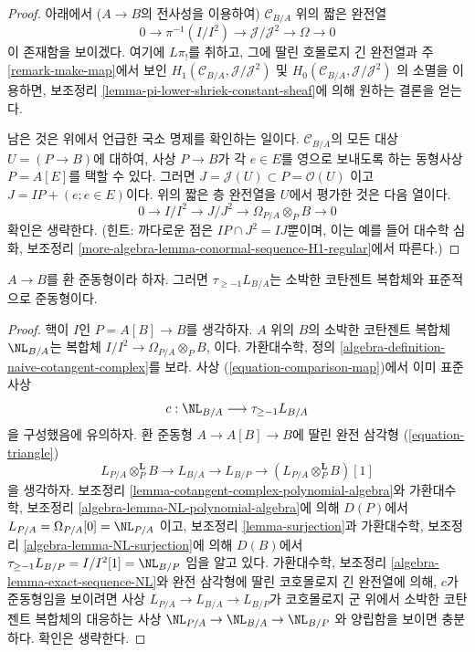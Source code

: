 \begin{proof}
아래에서 ($A \to B$의 전사성을 이용하여) $\mathcal{C}_{B/A}$ 위의 짧은
완전열
$$
0 \to \pi^{-1}(I/I^2) \to \mathcal{J}/\mathcal{J}^2 \to \Omega \to 0
$$
이 존재함을 보이겠다. 여기에 $L\pi_!$를 취하고, 그에 딸린 호몰로지
긴 완전열과 주 \ref{remark-make-map}에서 보인
$H_1(\mathcal{C}_{B/A}, \mathcal{J}/\mathcal{J}^2)$ 및
$H_0(\mathcal{C}_{B/A}, \mathcal{J}/\mathcal{J}^2)$
의 소멸을 이용하면, 보조정리
\ref{lemma-pi-lower-shriek-constant-sheaf}에 의해 원하는 결론을 얻는다.

\medskip\noindent
남은 것은 위에서 언급한 국소 명제를 확인하는 일이다.
$\mathcal{C}_{B/A}$의 모든 대상 $U = (P \to B)$에 대하여, 사상
$P \to B$가 각 $e \in E$를 영으로 보내도록 하는 동형사상
$P = A[E]$를 택할 수 있다. 그러면
$J = \mathcal{J}(U) \subset P = \mathcal{O}(U)$
이고 $J = IP + (e; e \in E)$이다. 위의 짧은 층 완전열을 $U$에서
평가한 것은 다음 열이다.
$$
0 \to I/I^2 \to J/J^2 \to \Omega_{P/A} \otimes_P B \to 0
$$
확인은 생략한다. (힌트: 까다로운 점은 $IP \cap J^2 = IJ$뿐이며, 이는
예를 들어 대수학 심화, 보조정리
\ref{more-algebra-lemma-conormal-sequence-H1-regular}에서 따른다.)
\end{proof}

\begin{lemma}
\label{lemma-relation-with-naive-cotangent-complex}
$A \to B$를 환 준동형이라 하자. 그러면 $\tau_{\geq -1}L_{B/A}$는
소박한 코탄젠트 복합체와 표준적으로 준동형이다.
\end{lemma}

\begin{proof}
핵이 $I$인 $P = A[B] \to B$를 생각하자. $A$ 위의 $B$의 소박한
코탄젠트 복합체 $\NL_{B/A}$는 복합체
$I/I^2 \to \Omega_{P/A} \otimes_P B$,
이다. 가환대수학, 정의
\ref{algebra-definition-naive-cotangent-complex}를 보라. 사상
(\ref{equation-comparison-map})에서 이미 표준 사상
$$
c : \NL_{B/A} \longrightarrow \tau_{\geq -1}L_{B/A}
$$
을 구성했음에 유의하자. 환 준동형 $A \to A[B] \to B$에 딸린 완전 삼각형
(\ref{equation-triangle})
$$
L_{P/A} \otimes_P^\mathbf{L} B \to L_{B/A} \to L_{B/P} \to 
(L_{P/A} \otimes_P^\mathbf{L} B)[1]
$$
을 생각하자. 보조정리
\ref{lemma-cotangent-complex-polynomial-algebra}와 가환대수학, 보조정리
\ref{algebra-lemma-NL-polynomial-algebra}에 의해 $D(P)$에서
$L_{P/A} = \Omega_{P/A}[0] = \NL_{P/A}$
이고, 보조정리 \ref{lemma-surjection}과 가환대수학, 보조정리
\ref{algebra-lemma-NL-surjection}에 의해 $D(B)$에서
$\tau_{\geq -1}L_{B/P} = I/I^2[1] = \NL_{B/P}$
임을 알고 있다. 가환대수학, 보조정리
\ref{algebra-lemma-exact-sequence-NL}와 완전 삼각형에 딸린 코호몰로지
긴 완전열에 의해, $c$가 준동형임을 보이려면 사상
$L_{P/A} \to L_{B/A} \to L_{B/P}$가 코호몰로지 군 위에서 소박한
코탄젠트 복합체의 대응하는 사상
$\NL_{P/A} \to \NL_{B/A} \to \NL_{B/P}$
와 양립함을 보이면 충분하다. 확인은 생략한다.
\end{proof}

